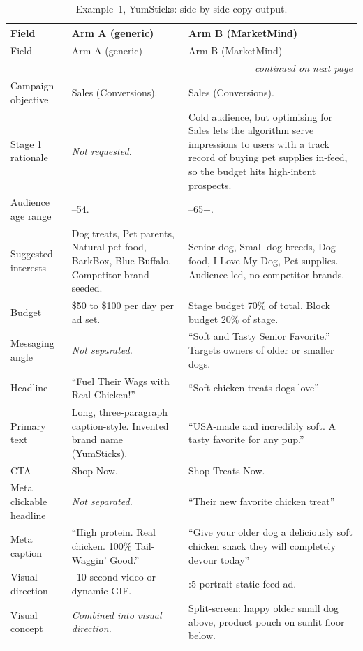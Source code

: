 \documentclass[12pt,a4paper]{report}
\begin{document}
{%
\small
\begin{longtable}{@{}p{1.3in}>{\raggedright\arraybackslash}p{2.2in}>{\raggedright\arraybackslash}p{2.2in}@{}}
  \caption{Example~1, YumSticks: side-by-side copy output.}
  \label{tab:ablation} \\
  \toprule
  Field & Arm A (generic) & Arm B (MarketMind) \\
  \midrule
  \endfirsthead
  \toprule
  Field & Arm A (generic) & Arm B (MarketMind) \\
  \midrule
  \endhead
  \midrule
  \multicolumn{3}{r}{\emph{continued on next page}} \\
  \endfoot
  \bottomrule
  \endlastfoot
  Campaign objective & Sales (Conversions). & Sales (Conversions). \\
  \addlinespace
  Stage 1 rationale & \emph{Not requested.} & Cold audience, but optimising for Sales lets the algorithm serve impressions to users with a track record of buying pet supplies in-feed, so the budget hits high-intent prospects. \\
  \addlinespace
  Audience age range & 25--54. & 25--65+. \\
  \addlinespace
  Suggested interests & Dog treats, Pet parents, Natural pet food, BarkBox, Blue Buffalo. Competitor-brand seeded. & Senior dog, Small dog breeds, Dog food, I Love My Dog, Pet supplies. Audience-led, no competitor brands. \\
  \addlinespace
  Budget & \$50 to \$100 per day per ad set. & Stage budget 70\% of total. Block budget 20\% of stage. \\
  \addlinespace
  Messaging angle & \emph{Not separated.} & ``Soft and Tasty Senior Favorite.'' Targets owners of older or smaller dogs. \\
  \addlinespace
  Headline & ``Fuel Their Wags with Real Chicken!'' & ``Soft chicken treats dogs love'' \\
  \addlinespace
  Primary text & Long, three-paragraph caption-style. Invented brand name (YumSticks). & ``USA-made and incredibly soft. A tasty favorite for any pup.'' \\
  \addlinespace
  CTA & Shop Now. & Shop Treats Now. \\
  \addlinespace
  Meta clickable headline & \emph{Not separated.} & ``Their new favorite chicken treat'' \\
  \addlinespace
  Meta caption & ``High protein. Real chicken. 100\% Tail-Waggin' Good.'' & ``Give your older dog a deliciously soft chicken snack they will completely devour today'' \\
  \addlinespace
  Visual direction & 6--10 second video or dynamic GIF. & 4:5 portrait static feed ad. \\
  \addlinespace
  Visual concept & \emph{Combined into visual direction.} & Split-screen: happy older small dog above, product pouch on sunlit floor below. \\
\end{longtable}
}
\end{document}
